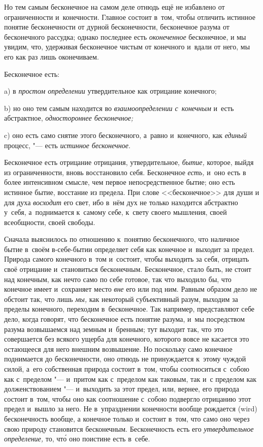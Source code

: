 Но тем самым бесконечное на самом деле отнюдь ещё не избавлено от
ограниченности и~конечности. Главное состоит в~том, чтобы отличить истинное
понятие бесконечности от дурной бесконечности, бесконечное разума от
бесконечного рассудка; однако последнее есть {\em оконеченное} бесконечное, и
мы увидим, что, удерживая бесконечное чистым от конечного и~вдали от него, мы
его как раз лишь оконечиваем.

Бесконечное есть:

a) в {\em простом определении} утвердительное как отрицание конечного;

b) но оно тем самым находится во {\em взаимоопределении
с~конечным} и~есть абстрактное, {\em одностороннее бесконечное;}

c) оно есть само снятие этого бесконечного, а~равно и~конечного, как
{\em единый} процесс, "--- есть {\em истинное бесконечное}.


Бесконечное есть отрицание отрицания, утвердительное,
{\em бытие,} которое, выйдя из ограниченности, вновь
восстановило себя. Бесконечное {\em есть,} и~оно есть в
более интенсивном смысле, чем первое непосредственное бытие; оно есть
истинное бытие, восстание из предела. При слове <<бесконечное>> для души и
для духа {\em восходит} его свет, ибо в~нём дух не
только находится абстрактно у~себя, а~поднимается к~самому себе, к~свету
своего мышления, своей всеобщности, своей свободы.

Сначала выяснилось по отношению к~понятию бесконечного, что наличное бытие
в~своём в-себе-бытии определяет себя как конечное и~выходит за предел. Природа
самого конечного в~том и~состоит, чтобы выходить за себя, отрицать своё
отрицание и~становиться бесконечным. Бесконечное, стало быть, не стоит над
конечным, как нечто само по себе готовое, так что выходило бы, что конечное
имеет и~сохраняет место {\em вне} его или под ним. Равным образом дело не
обстоит так, что лишь {\em мы,} как некоторый субъективный разум, выходим за
пределы конечного, переходим в~бесконечное. Так например, представляют себе
дело, когда говорят, что бесконечное есть понятие разума, и~мы посредством
разума возвышаемся над земным и~бренным; тут выходит так, что это совершается
без всякого ущерба для конечного, которого вовсе не касается это остающееся для
него внешним возвышение. Но поскольку само конечное поднимается до
бесконечности, оно отнюдь не принуждается к~этому чуждой силой, а~его
собственная природа состоит в~том, чтобы соотноситься с~собою как с~пределом
"--- и~притом как с~пределом как таковым, так и~с пределом как долженствованием
"--- и~выходить за этот предел, или, вернее, его природа состоит в~том, чтобы
оно как соотношение с~собою подвергло отрицанию этот предел и~вышло за него. Не
в~упразднении конечности вообще рождается (wird) бесконечность вообще, а
конечное только и~состоит в~том, что само оно через свою природу становится
бесконечным. Бесконечность есть его {\em утвердительное определение,}
то, чт\'{о} оно поистине есть в~себе.

